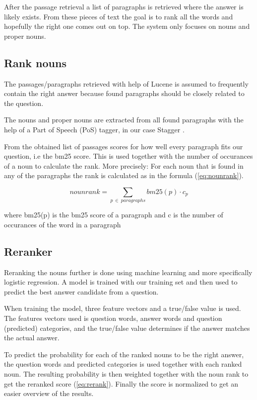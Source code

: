 After the passage retrieval a list of paragraphs is retrieved where the answer is likely exists. 
From these pieces of text the goal is to rank all the words and hopefully the right one comes out on top.
The system only focuses on nouns and proper nouns.

\subsection{Rank nouns}

The passages/paragraphs retrieved with help of Lucene is assumed to frequently contain the right answer
because found paragraphs should be closely related to the question.

The nouns and proper nouns are extracted from all found paragraphs with the help of a Part of Speech (PoS) 
tagger, in our case Stagger \cite{stagger}.

From the obtained list of passages scores for how well every paragraph fits our question, i.e the bm25 score. 
This is used together with the number of occurances of a noun to calculate the rank.
More precisely: For each noun that is found in any of the paragraphs the rank is calculated as in the formula (\ref{eq:nounrank}).

\begin{equation}
nounrank = \sum_{p\:\in\:paragraphs}bm25(p) \cdot c_p
\label{eq:nounrank}
\end{equation}

where bm25(p) is the bm25 score of a paragraph and c is the number of occurances of the word in a paragraph

\subsection{Reranker}

Reranking the nouns further is done using machine learning and more specifically logistic regression.
A model is trained with our training set and then used to predict the best answer candidate from a question.

When training the model, three feature vectors and a true/false value is used. 
The features vectors used is question words, answer words and question (predicted) categories, and the true/false
value determines if the answer matches the actual answer.

To predict the probability for each of the ranked nouns to be the right answer, the question words and predicted categories
is used together with each ranked noun. The resulting probability is then weighted together with the noun rank to get the
reranked score (\ref{eq:rerank}). Finally the score is normalized to get an easier overview of the results.

